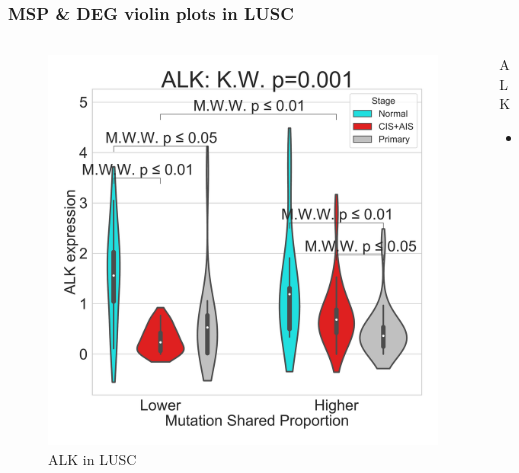 \documentclass{beamer}
\begin{document}
                \begin{frame}[allowframebreaks]
                    \frametitle{MSP \& DEG violin plots in LUSC}

                    \begin{columns}
                        \begin{column}{0.4 \textwidth}
                            \begin{figure}
                                \includegraphics[width=\linewidth]{figures/DEG/Violin/STAR.TPM.SQC.MSP-Median.violin/Mutation Shared Proportion_ALK.pdf}
                                \caption{ALK in LUSC}
                            \end{figure}
                        \end{column}
                        \begin{column}{0.55 \textwidth}
                            \begin{block}{ALK}
                                \begin{itemize}
                                    \item
                                \end{itemize}
                            \end{block}
                        \end{column}
                    \end{columns}


\end{frame}
\end{document}
